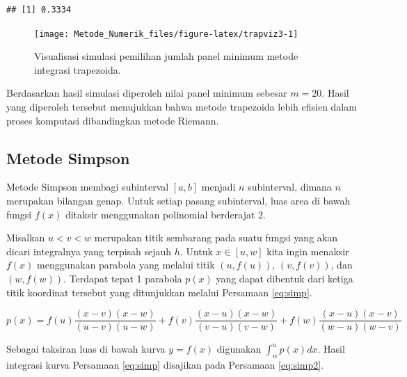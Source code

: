 \documentclass[
]{book}
\theoremstyle{definition}
\theoremstyle{definition}
\theoremstyle{definition}
\theoremstyle{definition}
\theoremstyle{remark}
\begin{document}
\begin{verbatim}
## [1] 0.3334
\end{verbatim}

\begin{figure}

{\centering \texttt{[image: Metode\_Numerik\_files/figure-latex/trapviz3-1]} 

}

\caption{Visualisasi simulasi pemilihan jumlah panel minimum metode integrasi trapezoida.}\label{fig:trapviz3}
\end{figure}

Berdasarkan hasil simulasi diperoleh nilai panel minimum sebesar \(m=20\). Hasil yang diperoleh tersebut menujukkan bahwa metode trapezoida lebih efisien dalam proses komputasi dibandingkan metode Riemann.

\hypertarget{simpson}{%
\subsection{Metode Simpson}\label{simpson}}

Metode Simpson membagi subinterval \(\left[a,b\right]\) menjadi
\(n\) subinterval, dimana \(n\) merupakan bilangan genap. Untuk setiap pasang subinterval, luas area di bawah fungsi \(f\left(x\right)\) ditaksir menggunakan polinomial berderajat 2.

Misalkan \(u<v<w\) merupakan titik sembarang pada suatu fungsi yang akan dicari integralnya yang terpisah sejauh \(h\). Untuk \(x\in\left[u,w\right]\) kita ingin menaksir \(f\left(x\right)\) menggunakan parabola yang melalui titik \(\left(u, f\left(u\right)\right)\), \(\left(v, f\left(v\right)\right)\), dan \(\left(w, f\left(w\right)\right)\). Terdapat tepat 1 parabola \(p\left(x\right)\) yang dapat dibentuk dari ketiga titik koordinat tersebut yang ditunjukkan melalui Persamaan \eqref{eq:simp}.

\begin{equation}
p\left(x\right)=f\left(u\right)\frac{\left(x-v\right)\left(x-w\right)}{\left(u-v\right)\left(u-w\right)}+f\left(v\right)\frac{\left(x-u\right)\left(x-w\right)}{\left(v-u\right)\left(v-w\right)}+f\left(w\right)\frac{\left(x-u\right)\left(x-v\right)}{\left(w-u\right)\left(w-v\right)}
  \label{eq:simp}
\end{equation}

Sebagai taksiran luas di bawah kurva \(y=f\left(x\right)\) digunakan \(\int_{w}^u p\left(x\right)dx\). Hasil integrasi kurva Persamaan \eqref{eq:simp} disajikan pada Persamaan \eqref{eq:simp2}.
\end{document}
